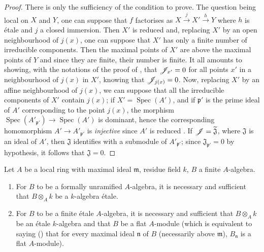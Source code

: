 \begin{proof}
There is only the sufficiency of the condition to prove.
The question being local on $X$ and $Y$, one can suppose  that $f$ factorises as $X\xrightarrow{j}X'\xrightarrow{h}Y$ where $h$ is \'etale and $j$ a closed immersion.
Then $X'$ is reduced  and, replacing $X'$ by an open neighbourhood of $j(x)$, one can suppose that $X'$ has only a finite number of irreducible components.
Then the maximal points of $X'$ are above the maximal points of $Y$  and since they are finite, their number is finite.
It all amounts to showing, with the notations of the proof of , that $\mathscr{J}_{x'}=0$ for all points $x'$ in a neighbourhood of $j(x)$ in $X'$, knowing that $\mathscr{J}_{j(x)}=0$.
Now, replacing $X'$ by an affine neighbourhood of $j(x)$, we can suppose that all the irreducible components of $X'$ contain $j(x)$;
if $X'=\operatorname{Spec}(A')$, and if $\mathfrak{p}'$ is the prime ideal of $A'$ corresponding to the point $j(x)$, the morphism $\operatorname{Spec}(A'_{\mathfrak{p}'})\to\operatorname{Spec}(A')$ is dominant, hence the corresponding homomorphism $A'\to A'_{\mathfrak{p}'}$ is \emph{injective} since $A'$ is reduced .
If $\mathscr{J}=\widetilde{\mathfrak{J}}$, where $\mathfrak{J}$ is an ideal of $A'$, then $\mathfrak{J}$ identifies with a submodule of $A'_{\mathfrak{p}'}$; since $\mathfrak{J}_{\mathfrak{p}'}=0$ by hypothesis, it follows that $\mathfrak{J}=0$.
\end{proof}

\begin{corollary}[18.4.14]
\label{IV.18.4.14}
Let $A$ be a local ring with maximal ideal $\mathfrak{m}$, residue field $k$, $B$ a finite $A$-algebra.
\begin{enumerate}
  \item[(i)] For $B$ to be a formally unramified $A$-algebra, it is necessary and sufficient that $B\otimes_A k$ be a $k$-algebra \'etale.
  \item[(ii)] For $B$ to be a finite \'etale $A$-algebra, it is necessary and sufficient that $B\otimes_A k$ be an \'etale $k$-algebra and that $B$ be a flat $A$-module (which is equivalent to saying () that for every maximal ideal $\mathfrak{n}$ of $B$ (necessarily above $\mathfrak{m}$), $B_\mathfrak{n}$ is a flat $A$-module).
\end{enumerate}
\end{corollary}

